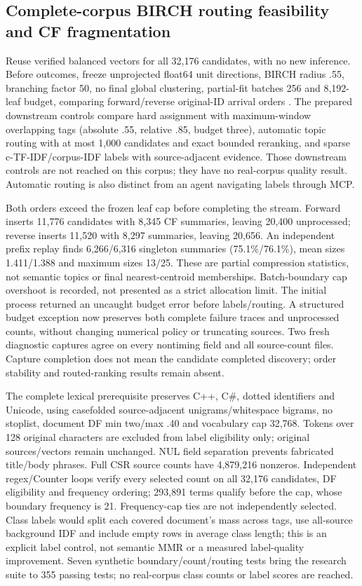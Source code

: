 \documentclass[11pt]{article}
\begin{document}
\subsection{Complete-corpus BIRCH routing feasibility and CF fragmentation}
Reuse verified balanced vectors for all 32,176 candidates, with no new inference.
Before outcomes, freeze unprojected float64 unit directions, BIRCH radius .55,
branching factor 50, no final global clustering, partial-fit batches 256 and
8,192-leaf budget, comparing forward/reverse original-ID arrival orders
\cite{birch,sklearnbirch}. The prepared downstream controls compare hard assignment
with maximum-window overlapping tags (absolute .55, relative .85, budget three),
automatic topic routing with at most 1,000 candidates and exact bounded reranking,
and sparse c-TF-IDF/corpus-IDF labels with source-adjacent evidence. Those downstream
controls are not reached on this corpus; they have no real-corpus quality result.
Automatic routing is also distinct from an agent navigating labels through MCP.

Both orders exceed the frozen leaf cap before completing the stream. Forward
inserts 11,776 candidates with 8,345 CF summaries, leaving 20,400 unprocessed;
reverse inserts 11,520 with 8,297 summaries, leaving 20,656. An independent
prefix replay finds 6,266/6,316 singleton summaries (75.1\%/76.1\%), mean sizes
1.411/1.388 and maximum sizes 13/25. These are partial compression statistics,
not semantic topics or final nearest-centroid memberships. Batch-boundary cap
overshoot is recorded, not presented as a strict allocation limit. The initial
process returned an uncaught budget error before labels/routing. A structured
budget exception now preserves both complete failure traces and unprocessed
counts, without changing numerical policy or truncating sources. Two fresh
diagnostic captures agree on every nontiming field and all source-count files.
Capture completion does not mean the candidate completed discovery; order
stability and routed-ranking results remain absent.

The complete lexical prerequisite preserves C++, C\#, dotted identifiers and
Unicode, using casefolded source-adjacent unigrams/whitespace bigrams, no stoplist,
document DF min two/max .40 and vocabulary cap 32,768. Tokens over 128 original
characters are excluded from label eligibility only; original sources/vectors
remain unchanged. NUL field separation prevents fabricated title/body phrases.
Full CSR source counts have 4,879,216 nonzeros. Independent regex/Counter loops
verify every selected count on all 32,176 candidates, DF eligibility and frequency
ordering; 293,891 terms qualify before the cap, whose boundary frequency is 21.
Frequency-cap ties are not independently selected. Class labels would split
each covered document's mass across tags, use all-source background IDF and
include empty rows in average class length\cite{bertopic}; this is an explicit
label control, not semantic MMR or a measured label-quality improvement.
Seven synthetic boundary/count/routing tests bring the research suite to 355
passing tests; no real-corpus class counts or label scores are reached.
\end{document}
